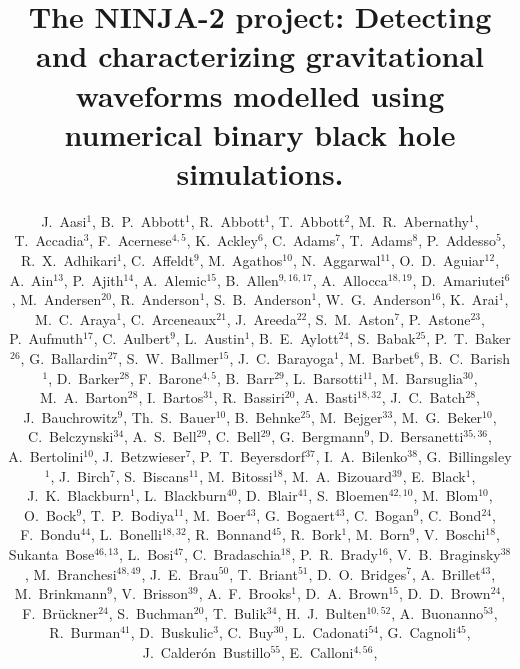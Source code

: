 \documentclass[12pt]{iopart}
\begin{document}
\title[The NINJA-2 project]{The NINJA-2 project: Detecting and characterizing 
gravitational waveforms modelled using numerical binary black hole 
simulations.}

\author{J.~Aasi$^{1}$, 
B.~P.~Abbott$^{1}$, 
R.~Abbott$^{1}$, 
T.~Abbott$^{2}$, 
M.~R.~Abernathy$^{1}$, 
T.~Accadia$^{3}$, 
F.~Acernese$^{4,5}$, 
K.~Ackley$^{6}$, 
C.~Adams$^{7}$, 
T.~Adams$^{8}$, 
P.~Addesso$^{5}$, 
R.~X.~Adhikari$^{1}$, 
C.~Affeldt$^{9}$, 
M.~Agathos$^{10}$, 
N.~Aggarwal$^{11}$, 
O.~D.~Aguiar$^{12}$, 
A.~Ain$^{13}$, 
P.~Ajith$^{14}$, 
A.~Alemic$^{15}$, 
B.~Allen$^{9,16,17}$, 
A.~Allocca$^{18,19}$, 
D.~Amariutei$^{6}$, 
M.~Andersen$^{20}$, 
R.~Anderson$^{1}$, 
S.~B.~Anderson$^{1}$, 
W.~G.~Anderson$^{16}$, 
K.~Arai$^{1}$, 
M.~C.~Araya$^{1}$, 
C.~Arceneaux$^{21}$, 
J.~Areeda$^{22}$, 
S.~M.~Aston$^{7}$, 
P.~Astone$^{23}$, 
P.~Aufmuth$^{17}$, 
C.~Aulbert$^{9}$, 
L.~Austin$^{1}$, 
B.~E.~Aylott$^{24}$, 
S.~Babak$^{25}$, 
P.~T.~Baker$^{26}$, 
G.~Ballardin$^{27}$, 
S.~W.~Ballmer$^{15}$, 
J.~C.~Barayoga$^{1}$, 
M.~Barbet$^{6}$, 
B.~C.~Barish$^{1}$, 
D.~Barker$^{28}$, 
F.~Barone$^{4,5}$, 
B.~Barr$^{29}$, 
L.~Barsotti$^{11}$, 
M.~Barsuglia$^{30}$, 
M.~A.~Barton$^{28}$, 
I.~Bartos$^{31}$, 
R.~Bassiri$^{20}$, 
A.~Basti$^{18,32}$, 
J.~C.~Batch$^{28}$, 
J.~Bauchrowitz$^{9}$, 
Th.~S.~Bauer$^{10}$, 
B.~Behnke$^{25}$, 
M.~Bejger$^{33}$, 
M.~G.~Beker$^{10}$, 
C.~Belczynski$^{34}$, 
A.~S.~Bell$^{29}$, 
C.~Bell$^{29}$, 
G.~Bergmann$^{9}$, 
D.~Bersanetti$^{35,36}$, 
A.~Bertolini$^{10}$, 
J.~Betzwieser$^{7}$, 
P.~T.~Beyersdorf$^{37}$, 
I.~A.~Bilenko$^{38}$, 
G.~Billingsley$^{1}$, 
J.~Birch$^{7}$, 
S.~Biscans$^{11}$, 
M.~Bitossi$^{18}$, 
M.~A.~Bizouard$^{39}$, 
E.~Black$^{1}$, 
J.~K.~Blackburn$^{1}$, 
L.~Blackburn$^{40}$, 
D.~Blair$^{41}$, 
S.~Bloemen$^{42,10}$, 
M.~Blom$^{10}$, 
O.~Bock$^{9}$, 
T.~P.~Bodiya$^{11}$, 
M.~Boer$^{43}$,
G.~Bogaert$^{43}$, 
C.~Bogan$^{9}$, 
C.~Bond$^{24}$, 
F.~Bondu$^{44}$, 
L.~Bonelli$^{18,32}$, 
R.~Bonnand$^{45}$, 
R.~Bork$^{1}$, 
M.~Born$^{9}$, 
V.~Boschi$^{18}$, 
Sukanta~Bose$^{46,13}$, 
L.~Bosi$^{47}$, 
C.~Bradaschia$^{18}$, 
P.~R.~Brady$^{16}$, 
V.~B.~Braginsky$^{38}$, 
M.~Branchesi$^{48,49}$, 
J.~E.~Brau$^{50}$, 
T.~Briant$^{51}$, 
D.~O.~Bridges$^{7}$, 
A.~Brillet$^{43}$, 
M.~Brinkmann$^{9}$, 
V.~Brisson$^{39}$, 
A.~F.~Brooks$^{1}$, 
D.~A.~Brown$^{15}$, 
D.~D.~Brown$^{24}$, 
F.~Br\"uckner$^{24}$, 
S.~Buchman$^{20}$, 
T.~Bulik$^{34}$, 
H.~J.~Bulten$^{10,52}$, 
A.~Buonanno$^{53}$, 
R.~Burman$^{41}$, 
D.~Buskulic$^{3}$, 
C.~Buy$^{30}$, 
L.~Cadonati$^{54}$, 
G.~Cagnoli$^{45}$, 
J.~Calder\'on~Bustillo$^{55}$, 
E.~Calloni$^{4,56}$, 
}
\end{document}
